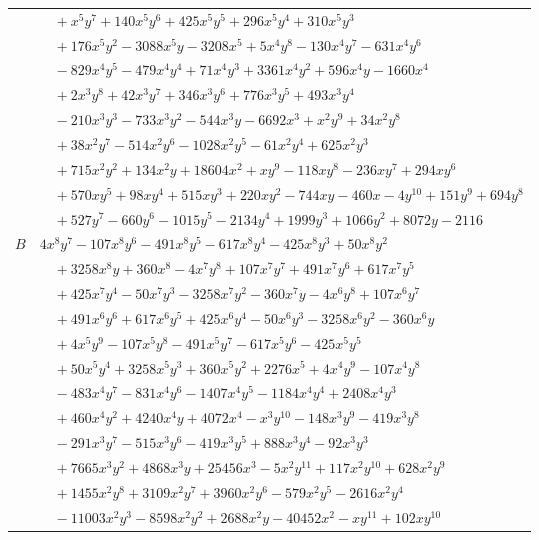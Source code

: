 \documentclass[11pt]{article}
\begin{document}
\begin{longtable}{@{}ll@{}}
 & $\quad +x^{5}y^{7}+140x^{5}y^{6}+425x^{5}y^{5}+296x^{5}y^{4}+310x^{5}y^{3}$\\
 & $\quad +176x^{5}y^{2}-3088x^{5}y-3208x^{5}+5x^{4}y^{8}-130x^{4}y^{7}-631x^{4}y^{6}$\\
 & $\quad -829x^{4}y^{5}-479x^{4}y^{4}+71x^{4}y^{3}+3361x^{4}y^{2}+596x^{4}y-1660x^{4}$\\
 & $\quad +2x^{3}y^{8}+42x^{3}y^{7}+346x^{3}y^{6}+776x^{3}y^{5}+493x^{3}y^{4}$\\
 & $\quad -210x^{3}y^{3}-733x^{3}y^{2}-544x^{3}y-6692x^{3}+x^{2}y^{9}+34x^{2}y^{8}$\\
 & $\quad +38x^{2}y^{7}-514x^{2}y^{6}-1028x^{2}y^{5}-61x^{2}y^{4}+625x^{2}y^{3}$\\
 & $\quad +715x^{2}y^{2}+134x^{2}y+18604x^{2}+xy^{9}-118xy^{8}-236xy^{7}+294xy^{6}$\\
 & $\quad +570xy^{5}+98xy^{4}+515xy^{3}+220xy^{2}-744xy-460x-4y^{10}+151y^{9}+694y^{8}$\\
 & $\quad +527y^{7}-660y^{6}-1015y^{5}-2134y^{4}+1999y^{3}+1066y^{2}+8072y-2116$\\
$B$ & $4x^{8}y^{7}-107x^{8}y^{6}-491x^{8}y^{5}-617x^{8}y^{4}-425x^{8}y^{3}+50x^{8}y^{2}$\\
 & $\quad +3258x^{8}y+360x^{8}-4x^{7}y^{8}+107x^{7}y^{7}+491x^{7}y^{6}+617x^{7}y^{5}$\\
 & $\quad +425x^{7}y^{4}-50x^{7}y^{3}-3258x^{7}y^{2}-360x^{7}y-4x^{6}y^{8}+107x^{6}y^{7}$\\
 & $\quad +491x^{6}y^{6}+617x^{6}y^{5}+425x^{6}y^{4}-50x^{6}y^{3}-3258x^{6}y^{2}-360x^{6}y$\\
 & $\quad +4x^{5}y^{9}-107x^{5}y^{8}-491x^{5}y^{7}-617x^{5}y^{6}-425x^{5}y^{5}$\\
 & $\quad +50x^{5}y^{4}+3258x^{5}y^{3}+360x^{5}y^{2}+2276x^{5}+4x^{4}y^{9}-107x^{4}y^{8}$\\
 & $\quad -483x^{4}y^{7}-831x^{4}y^{6}-1407x^{4}y^{5}-1184x^{4}y^{4}+2408x^{4}y^{3}$\\
 & $\quad +460x^{4}y^{2}+4240x^{4}y+4072x^{4}-x^{3}y^{10}-148x^{3}y^{9}-419x^{3}y^{8}$\\
 & $\quad -291x^{3}y^{7}-515x^{3}y^{6}-419x^{3}y^{5}+888x^{3}y^{4}-92x^{3}y^{3}$\\
 & $\quad +7665x^{3}y^{2}+4868x^{3}y+25456x^{3}-5x^{2}y^{11}+117x^{2}y^{10}+628x^{2}y^{9}$\\
 & $\quad +1455x^{2}y^{8}+3109x^{2}y^{7}+3960x^{2}y^{6}-579x^{2}y^{5}-2616x^{2}y^{4}$\\
 & $\quad -11003x^{2}y^{3}-8598x^{2}y^{2}+2688x^{2}y-40452x^{2}-xy^{11}+102xy^{10}$\\

\end{longtable}
\end{document}

